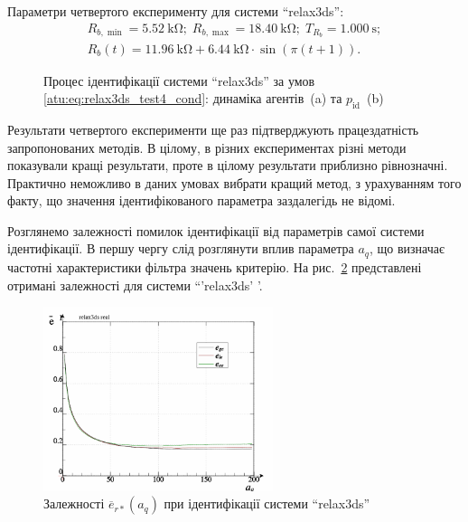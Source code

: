 Параметри четвертого експерименту для системи ``relax3ds'':
%
\begin{equation}
  \begin{array}{c}
    R_{b,\min} = \SI{5.52}{\kilo\ohm};
    \;
    R_{b,\max} = \SI{18.40}{\kilo\ohm};
    \;
    T_{R_b} = \SI{1.000}{\second};
  \\
    R_b(t) = \SI{11.96}{\kilo\ohm} + \SI{6.44}{\kilo\ohm} \cdot \sin( \pi ( t + 1 ) ).
  \end{array}
  \label{atu:eq:relax3ds_test4_cond}
\end{equation}

\begin{figure}[htb!]
  \caption{Процес ідентифікації системи ``relax3ds'' за умов \ref{atu:eq:relax3ds_test4_cond}: динаміка агентів~(a) та $p_\mathrm{id}$~(b)}
  \label{atu:f:relax3ds_id_3}
\end{figure}

Результати четвертого експерименти ще раз підтверджують
працездатність запропонованих методів. В цілому, в різних
експериментах різні методи показували кращі результати, проте
в цілому результати приблизно рівнозначні. Практично неможливо
в даних умовах вибрати кращий метод, з урахуванням того факту,
що значення ідентифікованого параметра заздалегідь не відомі.

Розглянемо залежності помилок ідентифікації від параметрів
самої системи ідентифікації. В першу чергу слід розглянути
вплив параметра
$a_q$, що визначає частотні характеристики фільтра значень
критерію. На рис.~\ref{atu:f:relax3ds_read_id2_prm_0-p_a_q} представлені отримані
залежності для системи ``'relax3ds' '.

\begin{figure}[htb!]
  \centerline{\includegraphics[width=0.6\textwidth]{p/relax3ds_read_id2_prm_0-p_a_q.png} }
\caption{Залежності $\overline{e}_{r *}(a_q)$ при ідентифікації системи ``relax3ds''}
  \label{atu:f:relax3ds_read_id2_prm_0-p_a_q}
\end{figure}

